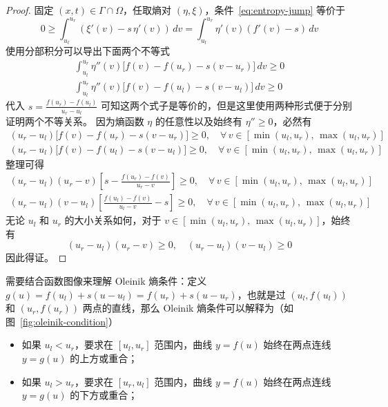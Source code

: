 \begin{proof}
    固定 $(x,t) \in \Gamma \cap \Omega$，任取熵对 $(\eta,\xi)$，条件~\eqref{eq:entropy-jump} 等价于
    \[
        0 \ge{}  \int_{u_l}^{u_r} \left(\xi'(v) - s\, \eta'(v)\right) \,dv
        = \int_{u_l}^{u_r} \eta'(v) \left(f'(v) - s\right) \,dv
    \]
    使用分部积分可以导出下面两个不等式
    \begin{gather*}
        \int_{u_l}^{u_r} \eta''(v) \big[ f(v) - f(u_r) - s(v - u_r) \big] \,dv \ge 0 \\
        \int_{u_l}^{u_r} \eta''(v) \big[ f(v) - f(u_l) - s(v - u_l) \big] \,dv \ge 0
    \end{gather*}
    代入 $s = \frac{f(u_r)-f(u_l)}{u_r - u_l}$ 可知这两个式子是等价的，但是这里使用两种形式便于分别证明两个不等关系。
    因为熵函数 $\eta$ 的任意性以及始终有 $\eta'' \ge 0$，必然有
    \begin{gather*}
        (u_r - u_l) \big[ f(v) - f(u_r) - s(v - u_r) \big] \ge 0,\quad \forall\,v \in [\min(u_l, u_r),\,\max(u_l, u_r)] \\
        (u_r - u_l) \big[ f(v) - f(u_l) - s(v - u_l) \big] \ge 0,\quad \forall\,v \in [\min(u_l, u_r),\,\max(u_l, u_r)]
    \end{gather*}
    整理可得
    \begin{gather*}
        (u_r - u_l)(u_r - v) \left[ s - \frac{f(u_r)-f(v)}{u_r-v} \right] \ge 0,\quad \forall\,v \in [\min(u_l, u_r),\,\max(u_l, u_r)] \\
        (u_r - u_l)(v - u_l) \left[ \frac{f(u_l)-f(v)}{u_l-v} - s\right] \ge 0,\quad \forall\,v \in [\min(u_l, u_r),\,\max(u_l, u_r)]
    \end{gather*}
    无论 $u_l$ 和 $u_r$ 的大小关系如何，对于 $v \in [\min(u_l, u_r),\,\max(u_l, u_r)]$，始终有
    \[
        (u_r - u_l)(u_r - v) \ge 0, \quad (u_r - u_l)(v - u_l) \ge 0
    \]
    因此得证。
\end{proof}

需要结合函数图像来理解 Oleinik 熵条件：定义 $g(u) = f(u_l) + s(u - u_l) = f(u_r) + s(u - u_r)$，也就是过 $(u_l,f(u_l))$ 和 $(u_r,f(u_r))$ 两点的直线，那么 Oleinik 熵条件可以解释为（如图~\ref{fig:oleinik-condition}）

\begin{itemize}
    \item 如果 $u_l < u_r$，要求在 $[u_l,u_r]$ 范围内，曲线 $y=f(u)$ 始终在两点连线 $y=g(u)$ 的上方或重合；
    \item 如果 $u_l > u_r$，要求在 $[u_r,u_l]$ 范围内，曲线 $y=f(u)$ 始终在两点连线 $y=g(u)$ 的下方或重合；
\end{itemize}

